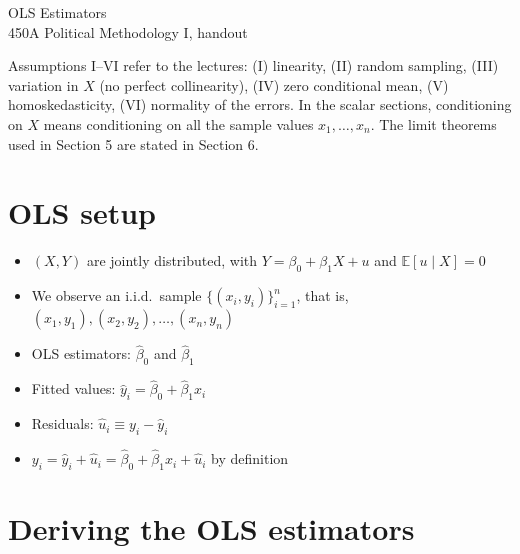 \documentclass[11pt]{article}
\newcommand\E{\mathbb{E}}
\begin{document}
\begin{center}
{\LARGE OLS Estimators}\\[4pt]
450A Political Methodology I, handout
\end{center}

\noindent Assumptions I--VI refer to the lectures: (I) linearity, (II) random sampling,
(III) variation in $X$ (no perfect collinearity), (IV) zero conditional mean, (V) homoskedasticity,
(VI) normality of the errors. In the scalar sections, conditioning on $X$ means conditioning on all
the sample values $x_1,\dots,x_n$. The limit theorems used in Section 5 are stated in Section 6.

\section{OLS setup}
\begin{itemize}
\item $(X,Y)$ are jointly distributed, with $Y=\beta_0+\beta_1 X+ u$ and $\E[u\mid X]=0$
\item We observe an i.i.d.\ sample $\{(x_i,y_i)\}_{i=1}^n$, that is, $(x_1,y_1), (x_2,y_2),\dots,(x_n,y_n)$
\item OLS estimators: $\hat \beta_0$ and $\hat \beta_1$
\item Fitted values: $\hat y_i= \hat\beta_0+\hat\beta_1 x_i$
\item Residuals: $\hat u_i \equiv y_i-\hat y_i$
\item $y_i=\hat y_i+\hat u_i=\hat\beta_0+\hat\beta_1 x_i+\hat u_i$ by definition
\end{itemize}

\section{Deriving the OLS estimators}
\end{document}
